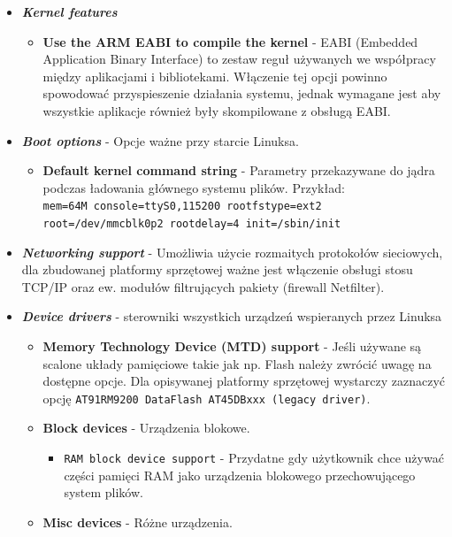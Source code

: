 \documentclass[a4paper,12pt]{book}
\begin{document}
\begin{itemize}
\begin{itemize}
							\end{itemize}
						\item \textit{\textbf{Kernel features}}
							\begin{itemize}
								\item \textbf{Use the ARM EABI to compile the kernel} - EABI (Embedded Application Binary Interface) to zestaw reguł używanych we współpracy między aplikacjami i bibliotekami. Włączenie tej opcji powinno spowodować przyspieszenie działania systemu, jednak wymagane jest aby wszystkie aplikacje również były skompilowane z obsługą EABI.
							\end{itemize}
						\item \textit{\textbf{Boot options}} - Opcje ważne przy starcie Linuksa.
							\begin{itemize}
								\item \textbf{Default kernel command string} - Parametry przekazywane do jądra podczas ładowania głównego systemu plików. Przykład:\\
								\texttt{mem=64M console=ttyS0,115200 rootfstype=ext2 root=/dev/mmcblk0p2 rootdelay=4 init=/sbin/init}
							\end{itemize}
						\item \textit{\textbf{Networking support}} - Umożliwia użycie rozmaitych protokołów sieciowych, dla zbudowanej platformy sprzętowej ważne jest włączenie obsługi stosu TCP/IP oraz ew. modułów filtrujących pakiety (firewall Netfilter).
						\item \textit{\textbf{Device drivers}} - sterowniki wszystkich urządzeń wspieranych przez Linuksa
							\begin{itemize}
								\item \textbf{Memory Technology Device (MTD) support} - Jeśli używane są scalone układy pamięciowe takie jak np. Flash należy zwrócić uwagę na dostępne opcje. Dla opisywanej platformy sprzętowej wystarczy zaznaczyć opcję \texttt{AT91RM9200 DataFlash AT45DBxxx (legacy driver)}.
								\item \textbf{Block devices} - Urządzenia blokowe.
									\begin{itemize}
										\item \texttt{RAM block device support} - Przydatne gdy użytkownik chce używać części pamięci RAM jako urządzenia blokowego przechowującego system plików.
									\end{itemize}
								\item \textbf{Misc devices} - Różne urządzenia.
									\begin{itemize}

\end{itemize}
\end{itemize}
\end{itemize}
\end{document}
